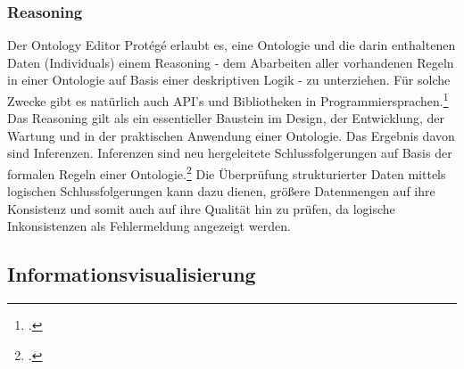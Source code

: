 \documentclass[12pt,a4paper]{article}
\begin{document}
\subsubsection{Reasoning}

Der Ontology Editor Protégé erlaubt es, eine Ontologie und die darin enthaltenen Daten (Individuals) einem Reasoning - dem Abarbeiten aller vorhandenen Regeln in einer Ontologie auf Basis einer deskriptiven Logik - zu unterziehen. Für solche Zwecke gibt es natürlich auch API's und Bibliotheken in Programmiersprachen.\footcite{musen2015protege} Das Reasoning gilt als ein essentieller Baustein im Design, der Entwicklung, der Wartung und in der praktischen Anwendung einer Ontologie. Das Ergebnis davon sind Inferenzen. Inferenzen sind neu hergeleitete Schlussfolgerungen auf Basis der formalen Regeln einer Ontologie.\footcite{dentler2011comparison} Die Überprüfung strukturierter Daten mittels logischen Schlussfolgerungen kann dazu dienen, größere Datenmengen auf ihre Konsistenz und somit auch auf ihre Qualität hin zu prüfen, da logische Inkonsistenzen als Fehlermeldung angezeigt werden.


\newpage
\subsection{Informationsvisualisierung}
\end{document}
